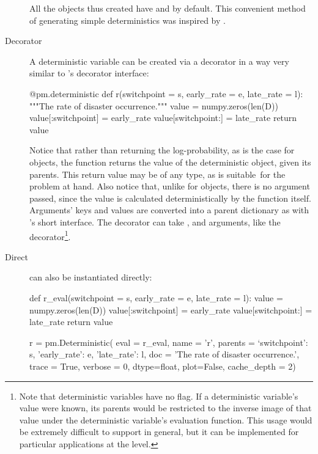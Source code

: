 \documentclass[]{jss}
\begin{document}
\begin{description}
All the objects thus created have  and  by default. This convenient method of generating simple deterministics was inspired by \citet{fbc}.

    \item[Decorator] A deterministic variable can be created via a decorator in a way very similar to 's decorator interface:
\begin{CodeInput}
@pm.deterministic
def r(switchpoint = s, early_rate = e, late_rate = l):
	"""The rate of disaster occurrence."""
	value = numpy.zeros(len(D))
	value[:switchpoint] = early_rate
	value[switchpoint:] = late_rate
	return value
\end{CodeInput}
Notice that rather than returning the log-probability, as is the case for  objects, the function returns the value of the deterministic object, given its parents. This return value may be of any type, as is suitable~for the problem at hand. Also notice that, unlike for  objects, there is no  argument passed, since the value is calculated deterministically by the function itself. Arguments' keys and values are converted into a parent dictionary as with 's short interface. The  decorator can take ,  and  arguments, like the  decorator\footnote{Note that deterministic variables have no  flag. If a deterministic variable's value were known, its parents would be restricted to the inverse image of that value under the deterministic variable's evaluation function. This usage would be extremely difficult to support in general, but it can be implemented for particular applications at the  level.}.

    \item[Direct]  can also be instantiated directly:
\begin{CodeInput}
def r_eval(switchpoint = s, early_rate = e, late_rate = l):
	value = numpy.zeros(len(D))
	value[:switchpoint] = early_rate
	value[switchpoint:] = late_rate
	return value

r = pm.Deterministic(  eval = r_eval,
                name = 'r',
                parents = {`switchpoint': s, 'early_rate': e, 'late_rate': l},
                doc = 'The rate of disaster occurrence.',
                trace = True,
                verbose = 0,
                dtype=float,
                plot=False,
                cache_depth = 2)
\end{CodeInput}
\end{description}
\end{document}
